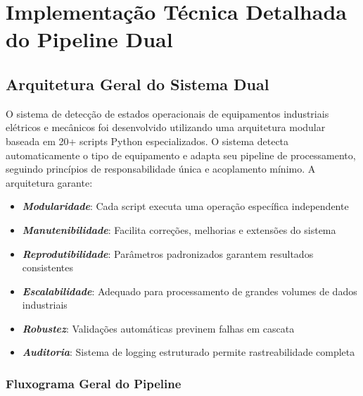 \section{Implementação Técnica Detalhada do Pipeline Dual}

\subsection{Arquitetura Geral do Sistema Dual}

O sistema de detecção de estados operacionais de equipamentos industriais elétricos e mecânicos foi desenvolvido utilizando uma arquitetura modular baseada em 20+ scripts Python especializados. O sistema detecta automaticamente o tipo de equipamento e adapta seu pipeline de processamento, seguindo princípios de responsabilidade única e acoplamento mínimo. A arquitetura garante:

\begin{itemize}
    \item \textbf{\textit{Modularidade}}: Cada script executa uma operação específica independente
    \item \textbf{\textit{Manutenibilidade}}: Facilita correções, melhorias e extensões do sistema
    \item \textbf{\textit{Reprodutibilidade}}: Parâmetros padronizados garantem resultados consistentes
    \item \textbf{\textit{Escalabilidade}}: Adequado para processamento de grandes volumes de dados industriais
    \item \textbf{\textit{Robustez}}: Validações automáticas previnem falhas em cascata
    \item \textbf{\textit{Auditoria}}: Sistema de logging estruturado permite rastreabilidade completa
\end{itemize}

\subsubsection{Fluxograma Geral do Pipeline}


